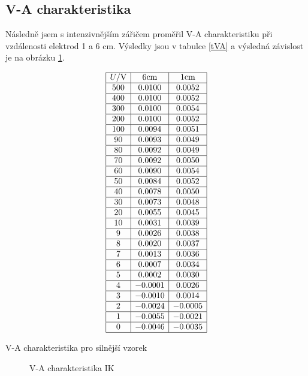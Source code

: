 \documentclass[a4paper,12pt]{article}
\begin{document}
\subsection{V-A charakteristika}
Následně jsem s intenzivnějším zářičem proměřil V-A charakteristiku při vzdálenosti elektrod 1 a 6 cm. Výsledky jsou v tabulce \ref{tVA} a výsledná 
závislost je na obrázku \ref{gVA}.

\begin{table}
$$
\begin{array}{|c|c|c|}
\hline
U/\mbox{V}& 6 \mbox{cm}&    1 \mbox{cm} \\ \hline
500&0.0100&0.0052\\ \hline
400&0.0100&0.0052\\ \hline
300&0.0100&0.0054\\ \hline
200&0.0100&0.0052\\ \hline
100&0.0094&0.0051\\ \hline
90&0.0093&0.0049\\ \hline
80&0.0092&0.0049\\ \hline
70&0.0092&0.0050\\ \hline
60&0.0090&0.0054\\ \hline
50&0.0084&0.0052\\ \hline
40&0.0078&0.0050\\ \hline
30&0.0073&0.0048\\ \hline
20&0.0055&0.0045\\ \hline
10&0.0031&0.0039\\ \hline
9&0.0026&0.0038\\ \hline
8&0.0020&0.0037\\ \hline
7&0.0013&0.0036\\ \hline
6&0.0007&0.0034\\ \hline
5&0.0002&0.0030\\ \hline
4&-0.0001&0.0026\\ \hline
3&-0.0010&0.0014\\ \hline
2&-0.0024&-0.0005\\ \hline
1&-0.0055&-0.0021\\ \hline
0&-0.0046&-0.0035\\ \hline
\end{array}
$$
\caption{V-A charakteristika pro silnější vzorek}
\label{tVA}
\end{table}

\begin{figure}
\begin{center}

\end{center}
\caption{V-A charakteristika IK}
\label{gVA}
\end{figure}
\end{document}
